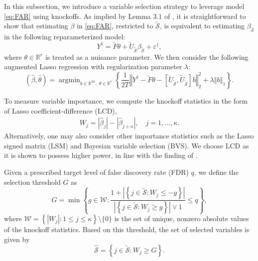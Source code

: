 ﻿\documentclass[12pt]{article}
\newcommand{\0}{\mbox{\bf 0}}
\theoremstyle{plain}%
\theoremstyle{definition}
\begin{document}
{In this subsection, we introduce a variable selection strategy to leverage model \eqref{eq:FAR} using knockoffs. As implied by Lemma 3.1 of \citet{FanKeWang2020}, it is straightforward to show that estimating $\beta$ in \eqref{eq:FAR}, restricted to $\widetilde{\mathcal{S}}$, is equivalent to estimating $\beta_{\widetilde{\mathcal{S}}}$ in the following reparameterized model:
\begin{equation*}
Y^{\dagger} = \breve{F} \theta + \breve{U}_{\widetilde{\mathcal{S}}} \beta_{\widetilde{\mathcal{S}}} + \varepsilon^{\dagger},
\end{equation*}
where $\theta \in \mathbb{R}^{r}$ is treated as a nuisance parameter. We then consider the following augmented Lasso regression with regularization parameter $\lambda$:
\begin{equation} \label{eq:Lasso_FAR}
(\widehat{\beta}, \widehat{\theta} )= \mathop{\arg\min}_{b \in \mathbb{R}^{2\kappa},\; \theta \in \mathbb{R}^{r}} \left\{ 
\frac{1}{2T} \left\Vert Y^{\dagger} - \breve{F} \theta - [\breve{U}_{\widetilde{\mathcal{S}}}, \widetilde{U}_{\widetilde{\mathcal{S}}}] b \right\Vert_2^2 
+ \lambda \left\Vert b \right\Vert_1 
\right\}.
\end{equation} 

To measure variable importance, we compute the knockoff statistics in the form of Lasso coefficient-difference (LCD),
\begin{align}
\label{eq:Wj}
W_j = |\widehat{\beta}_j| - |\widehat{\beta}_{j+\kappa}|, \quad j = 1, \ldots, \kappa. 
\end{align}
Alternatively, one may also consider other importance statistics such as the Lasso signed matrix (LSM) and Bayesian variable selection (BVS). We choose LCD as it is shown to possess higher power, in line with the finding of \citet{CandesFanEtal2018}.

Given a prescribed target level of false discovery rate (FDR) $q$, we define the selection threshold $G$ as
\begin{equation}
\label{eq:G}
G = \min \left\{ g \in \mathcal{W} : \frac{1 + \left| \left\{ j \in \widetilde{\mathcal{S}} : W_j \leq -g \right\} \right|}{\left| \left\{ j \in \widetilde{\mathcal{S}} : W_j \geq g \right\} \right| \vee 1} \leq q \right\},
\end{equation}
where $\mathcal{W} = \left\{ |W_j| : 1 \leq j \leq \kappa \right\} \setminus \{0\}$ is the set of unique, nonzero absolute values of the knockoff statistics. Based on this threshold, the  set of selected variables is given by
\begin{equation*}
\widehat{\mathcal{S}} = \left\{ j \in \widetilde{\mathcal{S}} : W_j \geq G \right\}.
\end{equation*}

}
\end{document}
